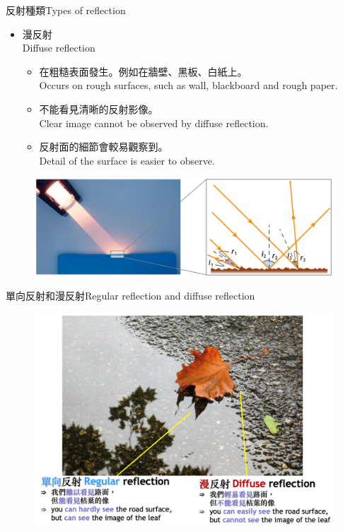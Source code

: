 \documentclass[beamer=true]{standalone}
\begin{document}
\begin{frame}{反射種類Types of reflection}
    \begin{itemize}
        \item 漫反射\\Diffuse reflection
        \begin{itemize}
            \item 在粗糙表面發生。例如在牆壁、黑板、白紙上。\\Occurs on rough surfaces, such as wall, blackboard and rough paper.
            \item 不能看見清晰的反射影像。\\Clear image cannot be observed by diffuse reflection.
            \item 反射面的細節會較易觀察到。\\Detail of the surface is easier to observe.
        \end{itemize}
    \end{itemize}
   \begin{figure}
       \centering
       \includegraphics[width=0.75\linewidth]{assets/ddojiqwoidwqjdoijqwodjqwodjqwiodj.png}
       
       
   \end{figure}
\end{frame}

\begin{frame}{單向反射和漫反射Regular reflection and diffuse reflection}
    \begin{figure}
        \centering
        \includegraphics[width=.85\linewidth]{assets/ddjidojoidjoqiwdjqwd.png}
        
        
    \end{figure}
\end{frame}
\end{document}
